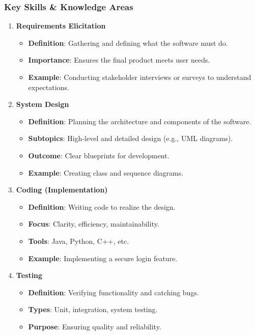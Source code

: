 \documentclass{beamer}
\begin{document}
\begin{frame}[fragile]
    \frametitle{Key Skills & Knowledge Areas}
    \begin{enumerate}
        \item \textbf{Requirements Elicitation}
        \begin{itemize}
            \item \textbf{Definition}: Gathering and defining what the software must do.
            \item \textbf{Importance}: Ensures the final product meets user needs.
            \item \textbf{Example}: Conducting stakeholder interviews or surveys to understand expectations.
        \end{itemize}
        \item \textbf{System Design}
        \begin{itemize}
            \item \textbf{Definition}: Planning the architecture and components of the software.
            \item \textbf{Subtopics}: High-level and detailed design (e.g., UML diagrams).
            \item \textbf{Outcome}: Clear blueprints for development.
            \item \textbf{Example}: Creating class and sequence diagrams.
        \end{itemize}
        \item \textbf{Coding (Implementation)}
        \begin{itemize}
            \item \textbf{Definition}: Writing code to realize the design.
            \item \textbf{Focus}: Clarity, efficiency, maintainability.
            \item \textbf{Tools}: Java, Python, C++, etc.
            \item \textbf{Example}: Implementing a secure login feature.
        \end{itemize}
        \item \textbf{Testing}
        \begin{itemize}
            \item \textbf{Definition}: Verifying functionality and catching bugs.
            \item \textbf{Types}: Unit, integration, system testing.
            \item \textbf{Purpose}: Ensuring quality and reliability.

\end{itemize}
\end{enumerate}
\end{frame}
\end{document}
